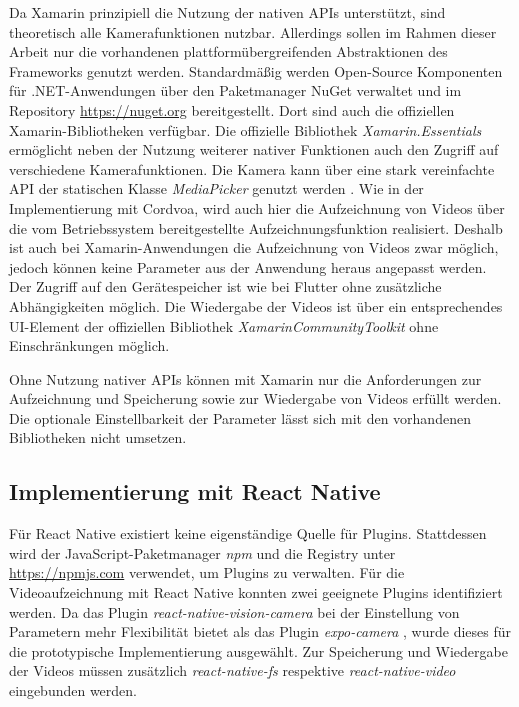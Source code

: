 Da Xamarin prinzipiell die Nutzung der nativen \acp{API} unterstützt, sind theoretisch alle Kamerafunktionen nutzbar.
Allerdings sollen im Rahmen dieser Arbeit nur die vorhandenen plattformübergreifenden Abstraktionen des Frameworks genutzt werden.
Standardmäßig werden Open-Source Komponenten für .NET-Anwendungen über den Paketmanager NuGet verwaltet und im Repository \url{https://nuget.org} bereitgestellt.
Dort sind auch die offiziellen Xamarin-Bibliotheken verfügbar.
Die offizielle Bibliothek \textit{Xamarin.Essentials} ermöglicht neben der Nutzung weiterer nativer Funktionen auch den Zugriff auf verschiedene Kamerafunktionen.
Die Kamera kann über eine stark vereinfachte \ac{API} der statischen Klasse \textit{MediaPicker} genutzt werden \cite{Xamarin_MediaPicker}.
Wie in der Implementierung mit Cordvoa, wird auch hier die Aufzeichnung von Videos über die vom Betriebssystem bereitgestellte Aufzeichnungsfunktion realisiert.
Deshalb ist auch bei Xamarin-Anwendungen die Aufzeichnung von Videos zwar möglich, jedoch können keine Parameter aus der Anwendung heraus angepasst werden.
Der Zugriff auf den Gerätespeicher ist wie bei Flutter ohne zusätzliche Abhängigkeiten möglich.
Die Wiedergabe der Videos ist über ein entsprechendes \ac{UI}-Element der offiziellen Bibliothek \textit{XamarinCommunityToolkit} \cite{Xamarin_CommunityToolkit} ohne Einschränkungen möglich.

Ohne Nutzung nativer \acp{API} können mit Xamarin nur die Anforderungen zur Aufzeichnung und Speicherung sowie zur Wiedergabe von Videos erfüllt werden.
Die optionale Einstellbarkeit der Parameter lässt sich mit den vorhandenen Bibliotheken nicht umsetzen.


\subsection{Implementierung mit React Native}
\label{sec:evaluation_reactnative}

Für React Native existiert keine eigenständige Quelle für Plugins.
Stattdessen wird der JavaScript-Paketmanager \textit{npm} und die Registry unter \url{https://npmjs.com} verwendet, um Plugins zu verwalten.
Für die Videoaufzeichnung mit React Native konnten zwei geeignete Plugins identifiziert werden.
Da das Plugin \textit{react-native-vision-camera} \cite{Vision_Camera} bei der Einstellung von Parametern mehr Flexibilität bietet als das Plugin \textit{expo-camera} \cite{Expo_Camera}, wurde dieses für die prototypische Implementierung ausgewählt.
Zur Speicherung und Wiedergabe der Videos müssen zusätzlich \textit{react-native-fs} \cite{ReactNative_FileSystem} respektive \textit{react-native-video} \cite{ReactNative_Video} eingebunden werden.

